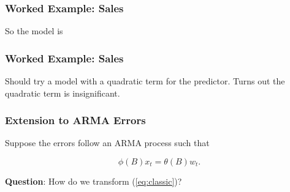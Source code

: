 \documentclass[%
xcolor=pdftex]{beamer}
\begin{document}
\begin{frame}
\frametitle{Worked Example: Sales}

So the model is

\vspace{50mm}

\end{frame}

\begin{frame}[fragile]
\frametitle{Worked Example: Sales}

Should try a model with a quadratic term for the predictor. Turns out the quadratic term is insignificant.



\end{frame}

\begin{frame}
\frametitle{Extension to ARMA Errors}

Suppose the errors follow an ARMA process such that

$$
\phi(B) x_t = \theta(B)w_t.
$$



\textbf{Question}: How do we transform (\ref{eq:classic})?

\end{frame}
\end{document}
